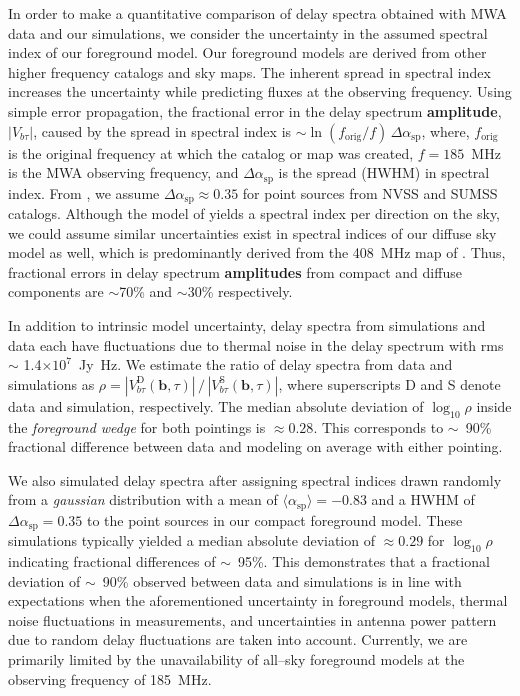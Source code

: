 \documentclass[preprint2,iop,numberedappendix]{emulateapj}
\begin{document}
In order to make a quantitative comparison of delay spectra obtained with MWA data and our simulations, we consider the uncertainty in the assumed spectral index of our foreground model. Our foreground models are derived from other higher frequency catalogs and sky maps. The inherent spread in spectral index increases the uncertainty while predicting fluxes at the observing frequency. Using simple error propagation, the fractional error in the delay spectrum {\bf amplitude}, $|V_{b\tau}|$, caused by the spread in spectral index is $\sim \ln(f_\textrm{orig}/f)\,\Delta\alpha_\textrm{sp}$, where, $f_\textrm{orig}$ is the original frequency at which the catalog or map was created, $f=185$~MHz is the MWA observing frequency, and $\Delta\alpha_\textrm{sp}$ is the spread (HWHM) in spectral index. From \citet{mau03}, we assume $\Delta\alpha_\textrm{sp} \approx 0.35$ for point sources from NVSS and SUMSS catalogs. Although the model of \citet{deo08} yields a spectral index per direction on the sky, we could assume similar uncertainties exist in spectral indices of our diffuse sky model as well, which is predominantly derived from the 408~MHz map of \citet{has82}. Thus, fractional errors in delay spectrum {\bf amplitudes} from compact and diffuse components are $\sim$70\% and $\sim$30\% respectively. 

In addition to intrinsic model uncertainty, delay spectra from simulations and data each have fluctuations due to thermal noise in the delay spectrum with rms $\sim$ 1.4$\times 10^7$~Jy~Hz. We estimate the ratio of delay spectra from data and simulations as $\rho = |V^\textrm{D}_{b\tau}(\boldsymbol{b},\tau)|\,/\,|V^\textrm{S}_{b\tau}(\boldsymbol{b},\tau)|$, where superscripts D and S denote data and simulation, respectively. The median absolute deviation of $\log_{10}\rho$ inside the {\it foreground wedge} for both pointings is $\approx 0.28$. This corresponds to $\sim$~90\% fractional difference between data and modeling on average with either pointing. 

We also simulated delay spectra after assigning spectral indices drawn randomly from a {\it gaussian} distribution with a mean of $\langle\alpha_\textrm{sp}\rangle=-0.83$ and a HWHM of $\Delta\alpha_\textrm{sp}=0.35$ to the point sources in our compact foreground model. These simulations typically yielded a median absolute deviation of $\approx 0.29$ for $\log_{10}\rho$ indicating fractional differences of $\sim$~95\%. This demonstrates that a fractional deviation of $\sim$~90\% observed between data and simulations is in line with expectations when the aforementioned uncertainty in foreground models, thermal noise fluctuations in measurements, and uncertainties in antenna power pattern due to random delay fluctuations are taken into account. Currently, we are primarily limited by the unavailability of all--sky foreground models at the observing frequency of 185~MHz. 
\end{document}
